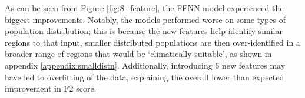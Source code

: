 As can be seen from Figure \ref{fig:8_feature}, the FFNN model experienced the biggest improvements. Notably, the models performed worse on some types of population distribution; this is because the new features help identify similar regions to that input, smaller distributed populations are then over-identified in a broader range of regions that would be `climatically suitable', as shown in appendix \ref{appendix:smalldistn}. Additionally, introducing 6 new features may have led to overfitting of the data, explaining the overall lower than expected improvement in F2 score.







